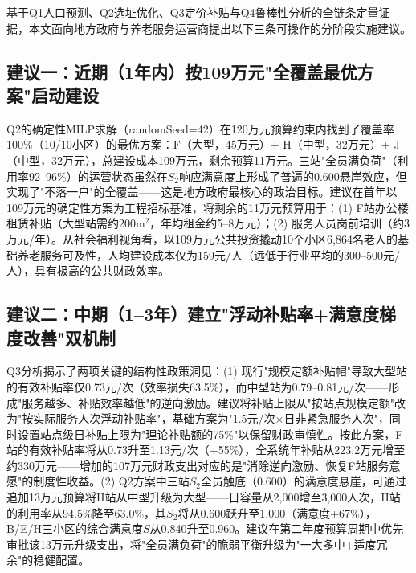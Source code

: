
基于Q1人口预测、Q2选址优化、Q3定价补贴与Q4鲁棒性分析的全链条定量证据，本文面向地方政府与养老服务运营商提出以下三条可操作的分阶段实施建议。

\subsection{建议一：近期（1年内）按109万元"全覆盖最优方案"启动建设}

Q2的确定性MILP求解（randomSeed=42）在120万元预算约束内找到了覆盖率100\%（10/10小区）的最优方案：F（大型，45万元）+ H（中型，32万元）+ J（中型，32万元），总建设成本109万元，剩余预算11万元。三站"全员满负荷"（利用率92--96\%）的运营状态虽然在$S_2$响应满意度上形成了普遍的0.600悬崖效应，但实现了"不落一户"的全覆盖——这是地方政府最核心的政治目标。建议在首年以109万元的确定性方案为工程招标基准，将剩余的11万元预算用于：(1) F站办公楼租赁补贴（大型站需约200m$^2$，年均租金约5--8万元）；(2) 服务人员岗前培训（约3万元/年）。从社会福利视角看，以109万元公共投资撬动10个小区6,864名老人的基础养老服务可及性，人均建设成本仅为159元/人（远低于行业平均的300--500元/人），具有极高的公共财政效率。

\subsection{建议二：中期（1--3年）建立"浮动补贴率+满意度梯度改善"双机制}

Q3分析揭示了两项关键的结构性政策洞见：(1) 现行"规模定额补贴帽"导致大型站的有效补贴率仅0.73元/次（效率损失63.5\%），而中型站为0.79--0.81元/次——形成"服务越多、补贴效率越低"的逆向激励。建议将补贴上限从"按站点规模定额"改为"按实际服务人次浮动补贴率"，基础方案为"1.5元/次$\times$日非紧急服务人次"，同时设置站点级日补贴上限为"理论补贴额的75\%"以保留财政审慎性。按此方案，F站的有效补贴率将从0.73升至1.13元/次（+55\%），全系统年补贴从223.2万元增至约330万元——增加的107万元财政支出对应的是"消除逆向激励、恢复F站服务意愿"的制度性收益。(2) Q2方案中三站$S_2$全员触底（0.600）的满意度悬崖，可通过追加13万元预算将H站从中型升级为大型——日容量从2,000增至3,000人次，H站的利用率从94.5\%降至63.0\%，其$S_2$将从0.600跃升至1.000（满意度+67\%），B/E/H三小区的综合满意度$S$从0.840升至0.960。建议在第二年度预算周期中优先审批该13万元升级支出，将"全员满负荷"的脆弱平衡升级为"一大多中+适度冗余"的稳健配置。

